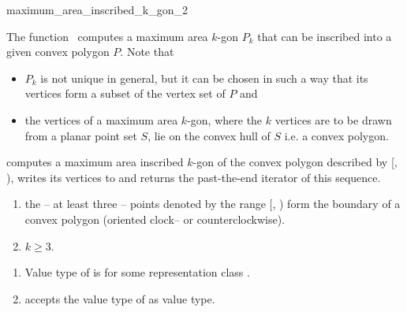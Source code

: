 
\cgalColumnLayout

\begin{ccRefFunction}{maximum_area_inscribed_k_gon_2}
  
  \ccDefinition The function \ccRefName\ computes a maximum area
  $k$-gon $P_k$ that can be inscribed into a given convex polygon $P$.
  Note that
  \begin{itemize}
  \item $P_k$ is not unique in general, but it can be chosen in such a
    way that its vertices form a subset of the vertex set of $P$ and
  \item the vertices of a maximum area $k$-gon, where the $k$ vertices
    are to be drawn from a planar point set $S$, lie on the convex
    hull of $S$ i.e. a convex polygon.
  \end{itemize}


  \def\ccLongParamLayout{\ccTrue} 
  
  
  computes a maximum area inscribed $k$-gon of the convex polygon
  described by [, ), writes its
  vertices to  and returns the past-the-end iterator of this
  sequence.
  
  \ccPrecond
  \begin{enumerate}
  \item the -- at least three -- points denoted by the range
    [, ) form the boundary of a
    convex polygon (oriented clock-- or counterclockwise).
  \item $k \ge 3$.
  \end{enumerate}
  
  \ccRequire
  \begin{enumerate}
  \item Value type of  is  for
    some representation class .
  \item {} accepts the value type of
     as value type.
  \end{enumerate}


\end{ccRefFunction}
